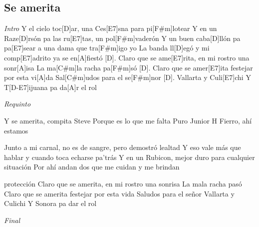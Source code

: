\subsection{Se amerita}
\noindent

\vspace{1cm}

\begin{guitar}
	\begin{multicols}{2}
		\textit{Intro}
		Y el cielo toc[D]ar, una Ces[E7]sna para pi[F#m]lotear
		Y en un Raze[D]rsón pa las ru[E7]tas, un pol[F#m]vaderón
		Y un buen caba[D]llón pa pa[E7]sear a una dama que tra[F#m]igo yo
		La banda ll[D]egó y mi comp[E7]adrito ya se en[A]fiestó [D].
		Claro que se ame[E7]rita, en mi rostro una sonr[A]isa
		La ma[C#m]la racha pa[F#m]só [D].
		Claro que se amer[E7]ita festejar por esta vi[A]da
		Sal[C#m]udos para el se[F#m]nor [D].
		Vallarta y Culi[E7]chi
		Y T[D-E7]ijuana pa da[A]r el rol

	\par
	\textit{Requinto}
	\par
	Y se amerita, compita Steve
	Porque es lo que me falta
	Puro Junior H
	Fierro, ahí estamos
	\par
	Junto a mi carnal, no es de sangre, pero demostró lealtad
	Y eso vale más que hablar y cuando toca echarse pa'trás
	Y en un Rubicon, mejor duro para cualquier situación
	Por ahí andan dos que me cuidan y me brindan\par protección
	Claro que se amerita, en mi rostro una sonrisa
	La mala racha pasó
	Claro que se amerita festejar por esta vida
	Saludos para el señor
	Vallarta y Culichi
	Y Sonora pa dar el rol
	\par
		\textit{Final}
	\end{multicols}
\end{guitar}
